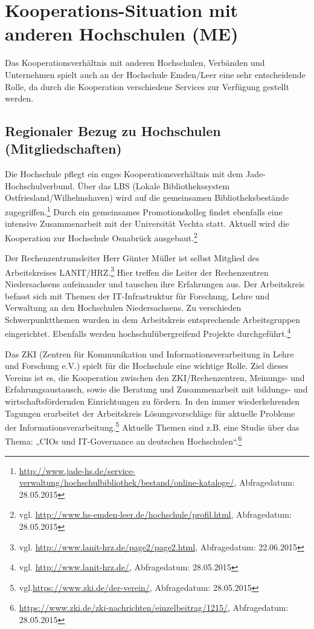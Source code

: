 \section{Kooperations-Situation mit anderen Hochschulen (ME)}
\label{section_kooperations_situation}

Das Kooperationsverhältnis mit anderen Hochschulen, Verbänden und Unternehmen spielt auch an der Hochschule Emden/Leer eine sehr entscheidende Rolle, da durch die Kooperation verschiedene Services zur Verfügung gestellt werden.

\subsection{Regionaler Bezug zu Hochschulen (Mitgliedschaften)}
Die Hochschule pflegt ein enges Kooperationsverhältnis mit dem Jade-Hochschulverbund. Über das LBS (Lokale Bibliothekssystem Ostfriesland/Wilhelmshaven) wird auf die gemeinsamen  Bibliotheksbestände zugegriffen.\footnote{\url{http://www.jade-hs.de/service-verwaltung/hochschulbibliothek/bestand/online-kataloge/}, Abfragedatum: 28.05.2015} Durch ein gemeinsames Promotionskolleg findet ebenfalls eine intensive Zusammenarbeit mit der Universität Vechta statt. Aktuell wird die Kooperation zur Hochschule Osnabrück ausgebaut.\footnote{vgl. \url{http://www.hs-emden-leer.de/hochschule/profil.html}, Abfragedatum: 28.05.2015}

Der Rechenzentrumsleiter Herr Günter Müller ist selbst Mitglied des Arbeitskreises LANIT/HRZ.\footnote{vgl. \url{http://www.lanit-hrz.de/page2/page2.html}, Abfragedatum: 22.06.2015} Hier treffen die Leiter der Rechenzentren Niedersachsens aufeinander und tauschen ihre Erfahrungen aus. Der Arbeitskreis befasst sich mit Themen der IT-Infrastruktur für Forschung, Lehre und Verwaltung an den Hochschulen Niedersachsens. Zu verschieden Schwerpunktthemen wurden in dem Arbeitskreis entsprechende Arbeitsgruppen eingerichtet.  Ebenfalls werden hochschulübergreifend Projekte durchgeführt.\footnote{vgl. \url{http://www.lanit-hrz.de/}, Abfragedatum: 28.05.2015}

Das ZKI (Zentren für Kommunikation und Informationsverarbeitung in Lehre und Forschung e.V.) spielt für die Hochschule eine wichtige Rolle. Ziel dieses Vereins ist es, die Kooperation zwischen den ZKI/Rechenzentren, Meinungs- und Erfahrungsaustausch, sowie die Beratung und Zusammenarbeit mit bildungs- und wirtschaftsfördernden Einrichtungen zu fördern. In den immer wiederkehrenden Tagungen erarbeitet der Arbeitskreis Lösungsvorschläge für aktuelle Probleme der Informationsverarbeitung.\footnote{vgl.\url{https://www.zki.de/der-verein/}, Abfragedatum: 28.05.2015} Aktuelle Themen sind z.B. eine Studie über das Thema: „CIOs und IT-Governance an deutschen Hochschulen“.\footnote{\url{https://www.zki.de/zki-nachrichten/einzelbeitrag/1215/}, Abfragedatum: 28.05.2015}

